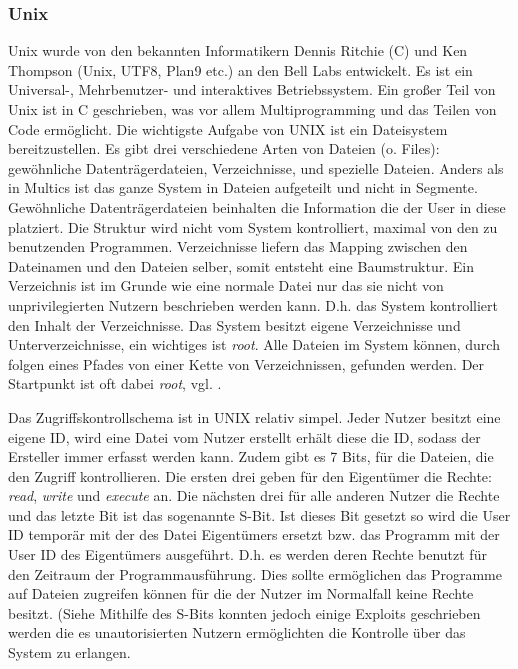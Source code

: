 \documentclass[11pt,technote]{IEEEtran}
\begin{document}
      \subsubsection{Unix}
		    Unix wurde von den bekannten Informatikern Dennis Ritchie (C) und Ken Thompson (Unix, UTF8, Plan9 etc.) an den Bell Labs entwickelt.
		    Es ist ein Universal-, Mehrbenutzer- und interaktives Betriebssystem. Ein gro\ss er Teil von Unix ist in C geschrieben, was vor allem Multiprogramming
		    und das Teilen von Code erm\"oglicht. Die wichtigste Aufgabe von UNIX ist ein Dateisystem bereitzustellen. Es gibt drei verschiedene Arten von Dateien (o. Files):
		    gew\"ohnliche Datentr\"agerdateien, Verzeichnisse, und spezielle Dateien. Anders als in Multics ist das ganze System in Dateien aufgeteilt und nicht in
		    Segmente. Gew\"ohnliche Datentr\"agerdateien beinhalten die Information die der User in diese platziert. Die Struktur wird nicht vom System kontrolliert, maximal
		    von den zu benutzenden Programmen. Verzeichnisse liefern das Mapping zwischen den Dateinamen und den Dateien selber, somit entsteht eine Baumstruktur.
		    Ein Verzeichnis ist im Grunde wie eine normale Datei nur das sie nicht von unprivilegierten Nutzern beschrieben werden kann. D.h. das System kontrolliert den
		    Inhalt der Verzeichnisse. Das System besitzt eigene Verzeichnisse und Unterverzeichnisse, ein wichtiges ist \textit{root}.
		    Alle Dateien im System k\"onnen, durch folgen eines Pfades von einer Kette von Verzeichnissen, gefunden werden. 
		    Der Startpunkt ist oft dabei \textit{root}, vgl. \cite[S. 366]{inproc:unix}.
		    
		    Das Zugriffskontrollschema ist in UNIX relativ simpel. Jeder Nutzer besitzt eine eigene ID, wird eine Datei vom Nutzer erstellt  erh\"alt diese die ID, sodass der Ersteller immer
		    erfasst werden kann. Zudem gibt es 7 Bits, f\"ur die Dateien, die den Zugriff kontrollieren. 
		    Die ersten drei geben f\"ur den Eigent\"umer die Rechte: \textit{read}, \textit{write} und \textit{execute} an.
		    Die n\"achsten drei f\"ur alle anderen Nutzer die Rechte und das letzte Bit ist das sogenannte S-Bit. Ist dieses Bit gesetzt so wird die User ID tempor\"ar
		    mit der des Datei Eigent\"umers ersetzt bzw. das Programm mit der User ID des Eigent\"umers ausgef\"uhrt.
		    D.h. es werden deren Rechte benutzt f\"ur den Zeitraum der Programmausf\"uhrung. Dies sollte erm\"oglichen das Programme
		    auf Dateien zugreifen k\"onnen f\"ur die der Nutzer im Normalfall keine Rechte besitzt. (Siehe \cite[S. 367]{inproc:unix}    
		    Mithilfe des S-Bits konnten jedoch einige Exploits geschrieben werden die es unautorisierten Nutzern erm\"oglichten
		    die Kontrolle \"uber das System zu erlangen. 
		    
\end{document}
